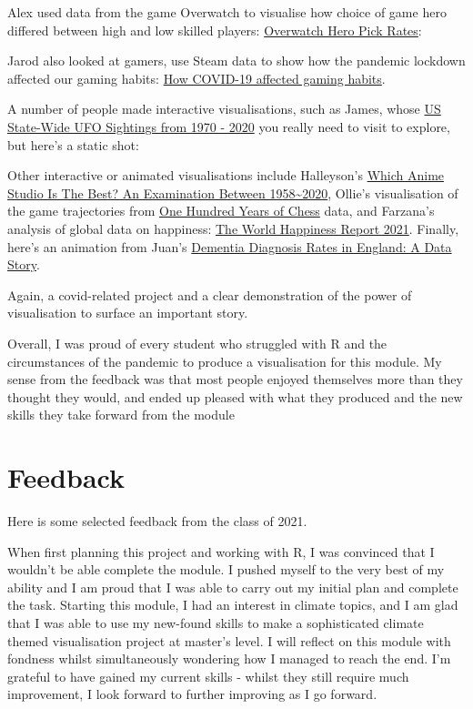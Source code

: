 \documentclass[
]{book}
\begin{document}
Alex used data from the game Overwatch to visualise how choice of game hero differed between high and low skilled players: \href{https://alexmontgomery-git.github.io/PSY6422_Project/}{Overwatch Hero Pick Rates}:

Jarod also looked at gamers, use Steam data to show how the pandemic lockdown affected our gaming habits: \href{https://jarod-wilson.github.io/psy6422/}{How COVID-19 affected gaming habits}.

A number of people made interactive visualisations, such as James, whose \href{https://jamesshuffley.shinyapps.io/ufo_app/}{US State-Wide UFO Sightings from 1970 - 2020} you really need to visit to explore, but here's a static shot:

Other interactive or animated visualisations include Halleyson's \href{https://halleyson.github.io/psy6422dataproject/}{Which Anime Studio Is The Best? An Examination Between 1958\textasciitilde2020}, Ollie's visualisation of the game trajectories from \href{https://olliebray.shinyapps.io/100YearsofChess/}{One Hundred Years of Chess} data, and Farzana's analysis of global data on happiness: \href{https://farz1313.github.io/farzana_patel_psy6422/}{The World Happiness Report 2021}. Finally, here's an animation from Juan's \href{https://jsgm21.github.io/gonzalezmartinez_psy6422_project/gonzalezmartinez_final_project}{Dementia Diagnosis Rates in England: A Data Story}.

Again, a covid-related project and a clear demonstration of the power of visualisation to surface an important story.

Overall, I was proud of every student who struggled with R and the circumstances of the pandemic to produce a visualisation for this module. My sense from the feedback was that most people enjoyed themselves more than they thought they would, and ended up pleased with what they produced and the new skills they take forward from the module

\hypertarget{feedback-1}{%
\section{Feedback}\label{feedback-1}}

Here is some selected feedback from the class of 2021.

When first planning this project and working with R, I was convinced that I wouldn't be able complete the module. I pushed myself to the very best of my ability and I am proud that I was able to carry out my initial plan and complete the task. Starting this module, I had an interest in climate topics, and I am glad that I was able to use my new-found skills to make a sophisticated climate themed visualisation project at master's level. I will reflect on this module with fondness whilst simultaneously wondering how I managed to reach the end. I'm grateful to have gained my current skills - whilst they still require much improvement, I look forward to further improving as I go forward.
\end{document}
